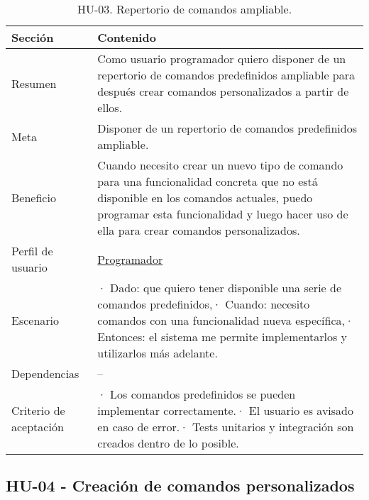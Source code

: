 \FloatBarrier
\begin{table}[h]
    \centering
    \def\arraystretch{1.25}
    \begin{adjustbox}{max width=\textwidth}
    \begin{tabularx}{\textwidth}{|l|L|}
    \hline
        \textbf{Sección} & \textbf{Contenido} \\ \hline
    \hline
        Resumen & Como usuario programador quiero disponer de un repertorio de comandos predefinidos ampliable para después crear comandos personalizados a partir de ellos. \\ \hline
        Meta & Disponer de un repertorio de comandos predefinidos ampliable. \\ \hline
        Beneficio & Cuando necesito crear un nuevo tipo de comando para una funcionalidad concreta que no está disponible en los comandos actuales, puedo programar esta funcionalidad y luego hacer uso de ella para crear comandos personalizados. \\ \hline
        Perfil de usuario & \hyperref[sec:personaProgramador]{Programador} \\ \hline
        Escenario & · Dado: que quiero tener disponible una serie de comandos predefinidos,\linebreak · Cuando: necesito comandos con una funcionalidad nueva específica,\linebreak · Entonces: el sistema me permite implementarlos y utilizarlos más adelante. \\ \hline
        Dependencias & – \\ \hline
        Criterio de aceptación & · Los comandos predefinidos se pueden implementar correctamente.\linebreak · El usuario es avisado en caso de error.\linebreak · Tests unitarios y integración son creados dentro de lo posible. \\ \hline
    \end{tabularx}
    \end{adjustbox}
    \caption{HU-03. Repertorio de comandos ampliable.}
\end{table}
\FloatBarrier

\bigskip
\bigskip
\bigskip
\bigskip
\bigskip
\bigskip
\pagebreak

\subsection{HU-04 - Creación de comandos personalizados}
\label{sec:hu04}

